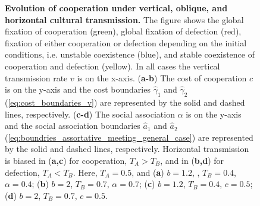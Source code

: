\documentclass[12pt]{extarticle}
\begin{document}
{\begin{figure}[h]
    \caption{\textbf{Evolution of cooperation under vertical, oblique, and horizontal cultural transmission.} 
    The figure shows the global fixation of cooperation (green), global fixation of defection (red), fixation of either cooperation or defection depending on the initial conditions, i.e. unstable coexistence (blue), and stable coexistence of cooperation and defection (yellow).
	In all cases the vertical transmission rate $v$ is on the x-axis.
	(\textbf{a-b}) The cost of cooperation $c$ is on the y-axis and the cost boundaries $\hat\gamma_1$ and $\hat\gamma_2$ (\autoref{eq:cost_boundaries_v}) are represented by the solid and dashed lines, respectively. 
    (\textbf{c-d}) The social association $\alpha$ is on the y-axis and the social association boundaries $\hat{a}_1$ and $\hat{a}_2$ (\autoref{eq:boundries_assortative_meeting_general_case}) are represented by the solid and dashed lines, respectively. 
    Horizontal transmission is biased in (\textbf{a,c}) for cooperation, $T_A>T_B$, and in (\textbf{b,d}) for defection, $T_A<T_B$.    
    Here, $T_A = 0.5$, and
    (\textbf{a}) $b=1.2$, , $T_B = 0.4$, $\alpha = 0.4$;
    (\textbf{b}) $b=2$, $T_B = 0.7$, $\alpha = 0.7$;
    (\textbf{c}) $b=1.2$, $T_B = 0.4$, $c=0.5$;
    (\textbf{d}) $b=2$, $T_B = 0.7$, $c=0.5$.
    }
    \label{fig:result3}
\end{figure}



}
\end{document}
